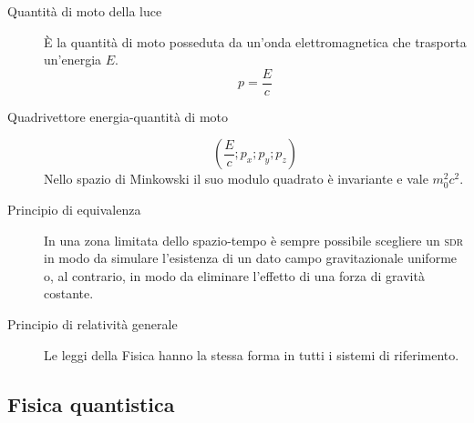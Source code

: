 \documentclass[a4paper,11pt,italian]{article}
\begin{document}
\begin{description}
  \item[Quantità di moto della luce] È la quantità di moto posseduta da un'onda elettromagnetica che trasporta un'energia $ E $.
  \[ p = \frac{E}{c} \]

  \item[Quadrivettore energia-quantità di moto]
  \[ \left( \frac{E}{c}; p_x ; p_y ; p_z \right) \]
  Nello spazio di Minkowski il suo modulo quadrato è invariante e vale $ m_0^2 c^2 $.
  
  \item[Principio di equivalenza] In una zona limitata dello spazio-tempo è sempre possibile scegliere un \textsc{sdr} in modo da simulare l'esistenza di un dato campo gravitazionale uniforme o, al contrario, in modo da eliminare l'effetto di una forza di gravità costante.
  
  \item[Principio di relatività generale]
  Le leggi della Fisica hanno la stessa forma in tutti i sistemi di riferimento.
\end{description}

\subsection{Fisica quantistica}
\end{document}
